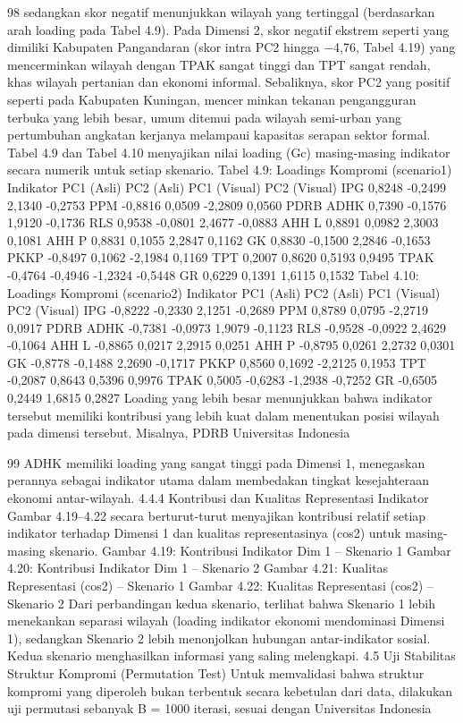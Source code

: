 98
sedangkan skor negatif menunjukkan wilayah yang tertinggal (berdasarkan arah loading
pada Tabel 4.9). Pada Dimensi 2, skor negatif ekstrem seperti yang dimiliki Kabupaten
Pangandaran (skor intra PC2 hingga −4,76, Tabel 4.19) yang mencerminkan wilayah
dengan TPAK sangat tinggi dan TPT sangat rendah, khas wilayah pertanian dan ekonomi
informal. Sebaliknya, skor PC2 yang positif seperti pada Kabupaten Kuningan, mencerminkan tekanan pengangguran terbuka yang lebih besar, umum ditemui pada wilayah
semi-urban yang pertumbuhan angkatan kerjanya melampaui kapasitas serapan sektor
formal.
Tabel 4.9 dan Tabel 4.10 menyajikan nilai loading (Gc) masing-masing indikator
secara numerik untuk setiap skenario.
Tabel 4.9: Loadings Kompromi (scenario1)
Indikator PC1 (Asli) PC2 (Asli) PC1 (Visual) PC2 (Visual)
IPG 0,8248 -0,2499 2,1340 -0,2753
PPM -0,8816 0,0509 -2,2809 0,0560
PDRB ADHK 0,7390 -0,1576 1,9120 -0,1736
RLS 0,9538 -0,0801 2,4677 -0,0883
AHH L 0,8891 0,0982 2,3003 0,1081
AHH P 0,8831 0,1055 2,2847 0,1162
GK 0,8830 -0,1500 2,2846 -0,1653
PKKP -0,8497 0,1062 -2,1984 0,1169
TPT 0,2007 0,8620 0,5193 0,9495
TPAK -0,4764 -0,4946 -1,2324 -0,5448
GR 0,6229 0,1391 1,6115 0,1532
Tabel 4.10: Loadings Kompromi (scenario2)
Indikator PC1 (Asli) PC2 (Asli) PC1 (Visual) PC2 (Visual)
IPG -0,8222 -0,2330 2,1251 -0,2689
PPM 0,8789 0,0795 -2,2719 0,0917
PDRB ADHK -0,7381 -0,0973 1,9079 -0,1123
RLS -0,9528 -0,0922 2,4629 -0,1064
AHH L -0,8865 0,0217 2,2915 0,0251
AHH P -0,8795 0,0261 2,2732 0,0301
GK -0,8778 -0,1488 2,2690 -0,1717
PKKP 0,8560 0,1692 -2,2125 0,1953
TPT -0,2087 0,8643 0,5396 0,9976
TPAK 0,5005 -0,6283 -1,2938 -0,7252
GR -0,6505 0,2449 1,6815 0,2827
Loading yang lebih besar menunjukkan bahwa indikator tersebut memiliki kontribusi
yang lebih kuat dalam menentukan posisi wilayah pada dimensi tersebut. Misalnya, PDRB
Universitas Indonesia

99
ADHK memiliki loading yang sangat tinggi pada Dimensi 1, menegaskan perannya sebagai
indikator utama dalam membedakan tingkat kesejahteraan ekonomi antar-wilayah.
4.4.4 Kontribusi dan Kualitas Representasi Indikator
Gambar 4.19–4.22 secara berturut-turut menyajikan kontribusi relatif setiap indikator
terhadap Dimensi 1 dan kualitas representasinya (cos2) untuk masing-masing skenario.
Gambar 4.19: Kontribusi Indikator Dim 1 –
Skenario 1
Gambar 4.20: Kontribusi Indikator Dim 1 –
Skenario 2
Gambar 4.21: Kualitas Representasi (cos2)
– Skenario 1
Gambar 4.22: Kualitas Representasi (cos2)
– Skenario 2
Dari perbandingan kedua skenario, terlihat bahwa Skenario 1 lebih menekankan
separasi wilayah (loading indikator ekonomi mendominasi Dimensi 1), sedangkan Skenario
2 lebih menonjolkan hubungan antar-indikator sosial. Kedua skenario menghasilkan
informasi yang saling melengkapi.
4.5 Uji Stabilitas Struktur Kompromi (Permutation Test)
Untuk memvalidasi bahwa struktur kompromi yang diperoleh bukan terbentuk secara
kebetulan dari data, dilakukan uji permutasi sebanyak B = 1000 iterasi, sesuai dengan
Universitas Indonesia

